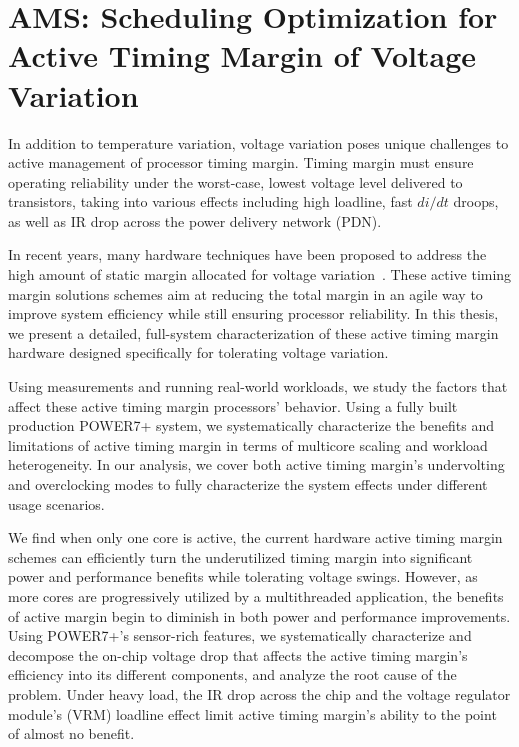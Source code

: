 
\section{AMS: Scheduling Optimization for Active Timing Margin of Voltage Variation}
\label{sec:ags}

In addition to temperature variation, voltage variation poses unique challenges to active management of processor timing margin. Timing margin must ensure operating reliability under the worst-case, lowest voltage level delivered to transistors, taking into various effects including high loadline, fast $di/dt$ droops, as well as IR drop across the power delivery network (PDN).

In recent years, many hardware techniques have been proposed to  address the high amount of static margin allocated for voltage variation~\cite{kurd2008next,lefurgy2011active,bowman201222nm,grenat20145,tokunaga20145,bowman20158}. These active timing margin solutions schemes aim at reducing the total margin in an agile way to improve system efficiency while still ensuring processor reliability. In this thesis, we present a detailed, full-system characterization of these active timing margin hardware designed specifically for tolerating voltage variation. 

Using measurements and running real-world workloads, we study the factors that affect these active timing margin processors' behavior. Using a fully built production POWER7+ system, we systematically characterize the benefits and limitations of active timing margin in terms of multicore scaling and workload heterogeneity. In our analysis, we cover both active timing margin's undervolting and overclocking modes to fully characterize the system effects under different usage scenarios. 

We find when only one core is active, the current hardware active timing margin schemes can efficiently turn the underutilized timing margin into significant power and performance benefits while tolerating voltage swings. However, as more cores are progressively utilized by a multithreaded application, the benefits of active margin begin to diminish in both power and performance improvements. Using POWER7+'s sensor-rich features, we systematically characterize and decompose the on-chip voltage drop that affects the active timing margin's efficiency into its different components, and analyze the root cause of the problem. Under heavy load, the IR drop across the chip and the voltage regulator module's (VRM) loadline effect limit active timing margin's ability to the point of almost no benefit. 

